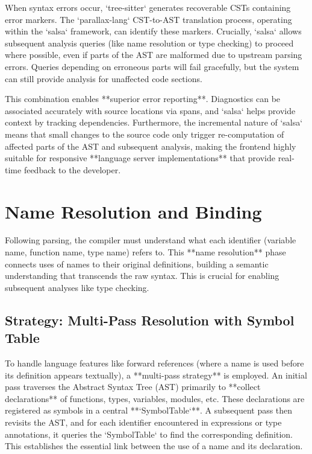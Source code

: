 When syntax errors occur, `tree-sitter` generates recoverable CSTs containing error markers. The `parallax-lang` CST-to-AST translation process, operating within the `salsa` framework, can identify these markers. Crucially, `salsa` allows subsequent analysis queries (like name resolution or type checking) to proceed where possible, even if parts of the AST are malformed due to upstream parsing errors. Queries depending on erroneous parts will fail gracefully, but the system can still provide analysis for unaffected code sections.

This combination enables **superior error reporting**. Diagnostics can be associated accurately with source locations via spans, and `salsa` helps provide context by tracking dependencies. Furthermore, the incremental nature of `salsa` means that small changes to the source code only trigger re-computation of affected parts of the AST and subsequent analysis, making the frontend highly suitable for responsive **language server implementations** that provide real-time feedback to the developer.

\section{Name Resolution and Binding} %
Following parsing, the compiler must understand what each identifier (variable name, function name, type name) refers to. This **name resolution** phase connects uses of names to their original definitions, building a semantic understanding that transcends the raw syntax. This is crucial for enabling subsequent analyses like type checking.

\subsection{Strategy: Multi-Pass Resolution with Symbol Table} %
To handle language features like forward references (where a name is used before its definition appears textually), a **multi-pass strategy** is employed. An initial pass traverses the Abstract Syntax Tree (AST) primarily to **collect declarations** of functions, types, variables, modules, etc. These declarations are registered as symbols in a central **`SymbolTable`**. A subsequent pass then revisits the AST, and for each identifier encountered in expressions or type annotations, it queries the `SymbolTable` to find the corresponding definition. This establishes the essential link between the use of a name and its declaration.

